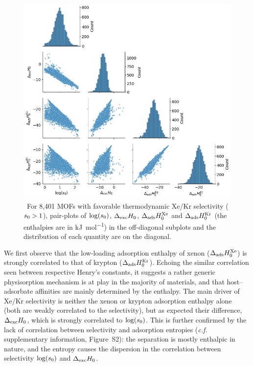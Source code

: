 \documentclass[main.tex]{subfiles}
\begin{document}
\begin{figure}[t]
\centering
  \includegraphics[width=\linewidth]{figures/2-thermo/Enthalpy_0_log.jpg}
  \caption{\ For 8,401 MOFs with favorable thermodynamic Xe/Kr selectivity ($s_{\text{0}} > 1$), pair-plots of $\log(s_{\text{0}})$, $\Delta_{\text{exc}}H_{\text{0}}$, $\Delta_{\text{ads}}H^{\text{Xe}}_{\text{0}}$ and $\Delta_{\text{ads}}H^{\text{Kr}}_{\text{0}}$ (the enthalpies are in \si{\kilo\joule\per\mol}) in the off-diagonal subplots and the distribution of each quantity are on the diagonal.}
  \label{fgr:histo_H}
\end{figure}

We first observe that the low-loading adsorption enthalpy of xenon ($\Delta_{\text{ads}}H^{\text{Xe}}_{\text{0}}$) is strongly correlated to that of krypton ($\Delta_{\text{ads}}H^{\text{Kr}}_{\text{0}}$). Echoing the similar correlation seen between respective Henry's constants, it suggests a rather generic physisorption mechanism is at play in the majority of materials, and that host--adsorbate affinities are mainly determined by the enthalpy. The main driver of Xe/Kr selectivity is neither the xenon or krypton adsorption enthalpy alone (both are weakly correlated to the selectivity), but as expected their difference, $\Delta_{\text{exc}}H_{\text{0}}$, which is strongly correlated to $\log(s_{\text{0}})$. This is further confirmed by the lack of correlation between selectivity and adsorption entropies (\emph{c.f.} supplementary information, Figure~S2): the separation is mostly enthalpic in nature, and the entropy causes the dispersion in the correlation between selectivity $\log(s_{\text{0}})$ and $\Delta_{\text{exc}}H_{\text{0}}$.
\end{document}
